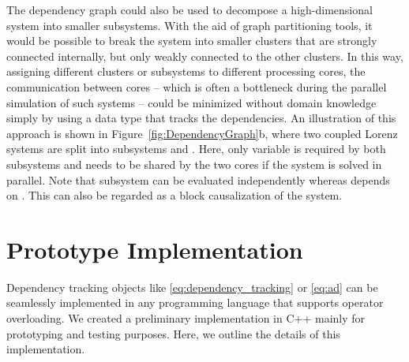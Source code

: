 \documentclass[10pt]{ijnam}
\theoremstyle{definition}
\begin{document}
The dependency graph could also be used to decompose a high-dimensional system into smaller subsystems. With the aid of graph partitioning tools, it would be possible to break the system into smaller clusters that are strongly connected internally, but only weakly connected to the other clusters. In this way, assigning different clusters or subsystems to different processing cores, the communication between cores -- which is often a bottleneck during the parallel simulation of such systems -- could be minimized without domain knowledge simply by using a data type that tracks the dependencies. An illustration of this approach is shown in Figure~\ref{fig:DependencyGraph}b, where two coupled Lorenz systems are split into subsystems  and . Here, only variable  is required by both subsystems and needs to be shared by the two cores if the system is solved in parallel. Note that subsystem  can be evaluated independently whereas  depends on . This can also be regarded as a block causalization of the system.


\section{Prototype Implementation} \label{sec:prototype}

Dependency tracking objects like \eqref{eq:dependency_tracking} or \eqref{eq:ad} can be seamlessly implemented in 
any programming language that supports operator overloading. 
We created a preliminary implementation in C++ mainly for prototyping and testing 
purposes. Here, we outline the details of this implementation.
\end{document}
